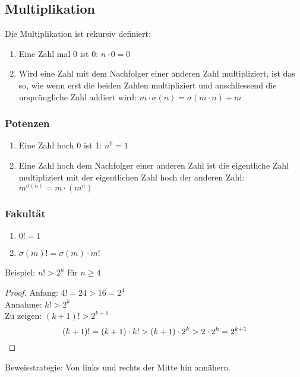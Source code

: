 \subsection{Multiplikation}
Die Multiplikation ist rekursiv definiert:
\begin{enumerate}
	\item Eine Zahl mal 0 ist 0: $n \cdot 0 = 0$\\
	\item Wird eine Zahl mit dem Nachfolger einer anderen Zahl multipliziert, ist das so, wie wenn
	erst die beiden Zahlen multipliziert und anschliessend die ursprüngliche Zahl addiert wird: $m \cdot \sigma(n) = \sigma(m \cdot n) + m$
\end{enumerate}

\subsubsection{Potenzen}
\begin{enumerate}
	\item Eine Zahl hoch 0 ist 1: $n^0 = 1$
	\item Eine Zahl hoch dem Nachfolger einer anderen Zahl ist die eigentliche Zahl multipliziert mit der eigentlichen Zahl hoch der anderen Zahl: $m^{\sigma(n)} = m \cdot (m^n)$
\end{enumerate}

\subsubsection{Fakultät}
\begin{enumerate}
	\item $0! = 1$
	\item $\sigma(m)! = \sigma(m) \cdot m!$
\end{enumerate}

Beispiel: $n! > 2^n$ für $n \geq 4$
\begin{proof}
	Anfang: $4! = 24 > 16 = 2^4$\\
	Annahme: $k! > 2^k$\\
	Zu zeigen: $(k + 1)! > 2^{k + 1}$
	\begin{equation*}
		(k + 1)! = (k + 1) \cdot k! > (k + 1) \cdot 2^k > 2 \cdot 2^k = 2^{k+1}\qedhere
	\end{equation*}
\end{proof}
Beweisstrategie: Von links und rechts der Mitte hin annähern.


